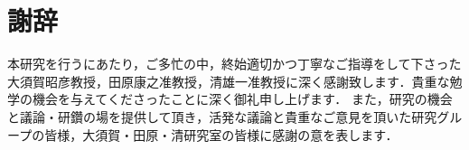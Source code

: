 \chapter*{謝辞}
本研究を行うにあたり，ご多忙の中，終始適切かつ丁寧なご指導をして下さった大須賀昭彦教授，田原康之准教授，清雄一准教授に深く感謝致します．貴重な勉学の機会を与えてくださったことに深く御礼申し上げます．
また，研究の機会と議論・研鑽の場を提供して頂き，活発な議論と貴重なご意見を頂いた研究グループの皆様，大須賀・田原・清研究室の皆様に感謝の意を表します．




